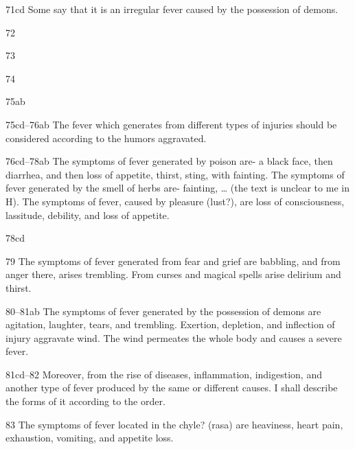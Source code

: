 \begin{translation}
    \item[71cd]  Some say that it is an irregular fever caused by the possession 
of
    demons.
    
   \item[72]  
    
   \item[73]  
    
   \item[74]  
    
   \item[75ab]  
    
    \item[75cd--76ab]  The fever which generates from different types of injuries
    should be considered according to the humors aggravated.
    
    
    \item[76cd--78ab]  The symptoms of fever generated by poison are- a black 
face,
    then diarrhea, and then loss of appetite, thirst, sting, with fainting.
    The symptoms of fever generated by the smell of herbs are- fainting,
    \ldots{} (the text is unclear to me in H). The symptoms of fever, caused
    by pleasure (lust?), are loss of consciousness, lassitude, debility, and
    loss of appetite.
    
   \item[78cd]  
    
    \item[79]  The symptoms of fever generated from fear and grief are babbling,
    and from anger there, arises trembling. From curses and magical spells
    arise delirium and thirst.
    
    
    \item[80--81ab]  The symptoms of fever generated by the possession of 
demons are
    agitation, laughter, tears, and trembling. Exertion, depletion, and
    inflection of injury aggravate wind.  The wind permeates the whole body
    and causes a severe fever.
    
    \item[81cd--82]  Moreover, from the rise of diseases, inflammation, 
indigestion,
    and another type of fever produced by the same or different causes. I
    shall describe the forms of it according to the order.
    
    
    \item[83]  The symptoms of fever located in the chyle? (rasa) are heaviness,
    heart pain, exhaustion, vomiting, and appetite loss.
    

\end{translation}
